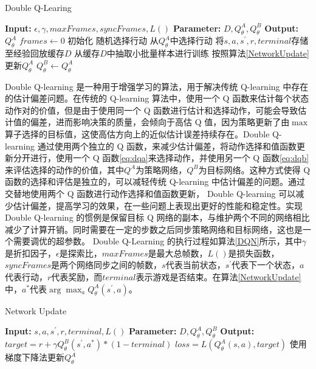 \documentclass[final,1p,12pt,UTF8,review]{elsarticle}
\begin{document}
\begin{algorithm}[htp]
    \caption{\label{DQN}Double Q-Learing}
    \begin{algorithmic}[1]
        \STATE \textbf{Input:} $\epsilon, \gamma, maxFrames, syncFrames, L()$
        \STATE \textbf{Parameter:} $D, Q_\theta^A, Q_\theta^B$
        \STATE \textbf{Output:} $Q_\theta^A$
        \STATE $frames \gets 0$
        \STATE 初始化
        \STATE 随机选择行动
        \ELSE
        \STATE 从$Q_\theta^A$中选择行动
        \ENDIF
        \STATE 将$s,a,s^{'},r,terminal$存储至经验回放缓存$D$
        \STATE 从缓存$D$中抽取小批量样本进行训练
        \STATE 按照算法\ref{NetworkUpdate}更新$Q_\theta^A$
        \ENDWHILE
        \STATE $Q_\theta^B \gets Q_\theta^A$
        \ENDIF
        \ENDWHILE
    \end{algorithmic}
\end{algorithm}

\par
Double Q-learning 是一种用于增强学习的算法，用于解决传统 Q-learning 中存在的估计偏差问题。在传统的 Q-learning 算法中，使用一个 Q 函数来估计每个状态动作对的价值，但是由于使用同一个 Q 函数进行估计和选择动作，可能会导致估计值的偏差，进而影响决策的质量，会倾向于高估 Q 值，因为策略更新了由$\max$算子选择的目标值，这使高估方向上的近似估计误差持续存在。Double Q-learning 通过使用两个独立的 Q 函数，来减少估计偏差，将动作选择和值函数更新分开进行，使用一个 Q 函数\ref{eq:dqa}来选择动作，并使用另一个 Q 函数\ref{eq:dqb}来评估选择的动作的价值，其中$Q^A$为策略网络，$Q^B$为目标网络。这种方式使得 Q 函数的选择和评估是独立的，可以减轻传统 Q-learning 中估计偏差的问题。通过交替地使用两个 Q 函数进行动作选择和值函数更新， Double Q-learning 可以减少估计偏差，提高学习的效果，在一些问题上表现出更好的性能和稳定性。实现 Double Q-learning 的惯例是保留目标 Q 网络的副本，与维护两个不同的网络相比减少了计算开销。同时需要在一定的步数之后同步策略网络和目标网络，这也是一个需要调优的超参数。 Double Q-Learning 的执行过程如算法\ref{DQN}所示，其中$\gamma$是折扣因子，$\epsilon$是探索比，$maxFrames$是最大总帧数，$L()$是损失函数，$syncFrames$是两个网络同步之间的帧数，$s$代表当前状态，$s^{'}$代表下一个状态，$a$代表行动，$r$代表奖励，而$terminal$表示游戏是否结束。在算法\ref{NetworkUpdate}中，$a^*$代表$\arg\max_aQ_\theta^A(s^{'},a)$。

\begin{algorithm}[htp]
    \caption{\label{NetworkUpdate}Network Update}
    \begin{algorithmic}[1]
        \STATE \textbf{Input:} $s,a,s^{'},r,terminal, L()$
        \STATE \textbf{Parameter:} $D, Q_\theta^A, Q_\theta^B$
        \STATE \textbf{Output:}
        \STATE $target = r + \gamma Q_\theta^B(s^{'},a^*)*(1-terminal)$
        \STATE $loss = L(Q_\theta^A(s,a), target)$
        \STATE 使用梯度下降法更新$Q_\theta^A$
        \RETURN
    \end{algorithmic}
\end{algorithm}
\end{document}
